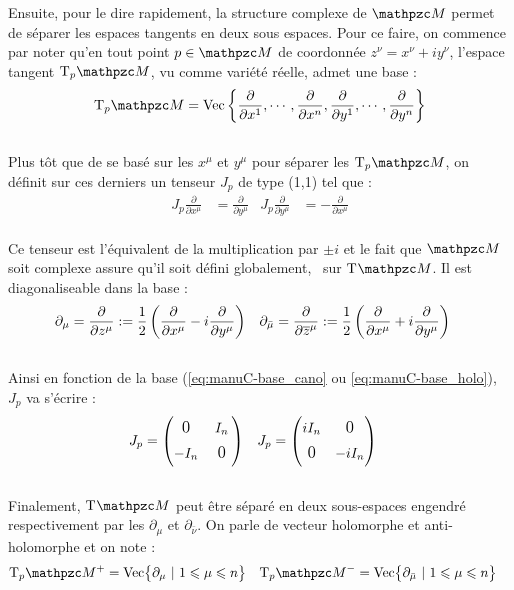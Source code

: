 Ensuite, pour le dire rapidement, la structure complexe de $\manu$ permet de séparer les espaces tangents en deux sous espaces. Pour ce faire, on commence par noter qu'en tout point $p\in\manu$ de coordonnée $z^\nu=x^\nu+iy^\nu$, l'espace tangent $\tg[p]{\manu}$, vu comme variété réelle, admet une base :
\begin{equation}
	\tg[p]{\manu} = \vec \left\{ \frac{\partial}{\partial x^1}, \cdots, \frac{\partial}{\partial x^n}, \frac{\partial}{\partial y^1}, \cdots,  \frac{\partial}{\partial y^n} \right\}
\end{equation}
\\
Plus tôt que de se basé sur les $x^\mu$ et $y^\mu$ pour séparer les $\tg[p]{\manu}$, on définit sur ces derniers un tenseur $J_p$ de type (1,1) tel que :
\begin{align}
	J_p \frac{\partial}{\partial x^\mu} &= \frac{\partial}{\partial y^\mu}  &  J_p \frac{\partial}{\partial y^\mu} &= -\frac{\partial}{\partial x^\mu}
\end{align}
\\
Ce tenseur est l'équivalent de la multiplication par $\pm i$ et le fait que $\manu$ soit complexe assure qu'il soit défini globalement, \ie~sur $\tg{\manu}$. Il est diagonaliseable dans la base :
\begin{align}\label{eq:manuC-base_holo}
	\partial_\mu = \frac{\partial}{\partial z^\mu} &:= \frac{1}{2}\left( \frac{\partial}{\partial x^\mu} - i\frac{\partial}{\partial y^\mu} \right)  
	&  
	\partial_{\bar{\mu}} = \frac{\partial}{\partial \overline{z}^\mu} &:= \frac{1}{2}\left( \frac{\partial}{\partial x^\mu} + i\frac{\partial}{\partial y^\mu} \right)
\end{align}
\\
Ainsi en fonction de la base (\eqref{eq:manuC-base_cano} ou \eqref{eq:manuC-base_holo}), $J_p$ va s'écrire :
\begin{align}
	J_p &= \begin{pmatrix}
		\text{\large\ 0\ }\Big. & I_n \\ -I_n & \text{\large\ 0\ }\Big.
	\end{pmatrix}  &
	J_p &= \begin{pmatrix}
		iI_n & \text{\large\ 0\ }\Big. \\ \text{\large\ 0\ }\Big. & -iI_n
	\end{pmatrix} 
\end{align}
\\
Finalement, $\tg{\manu}$ peut être séparé en deux sous-espaces engendré respectivement par les $\partial_\mu$ et $\partial_{\bar{\nu}}$. On parle de vecteur holomorphe et anti-holomorphe et on note :
\begin{align}
	\tg[p]{\manu}^+ &= \Vec\big\{ \partial_\mu\ |\ 1\leq \mu\leq n \big\}  &  \tg[p]{\manu}^- &= \Vec\big\{ \partial_{\bar{\mu}}\ |\ 1\leq \mu\leq n \big\}
\end{align}




